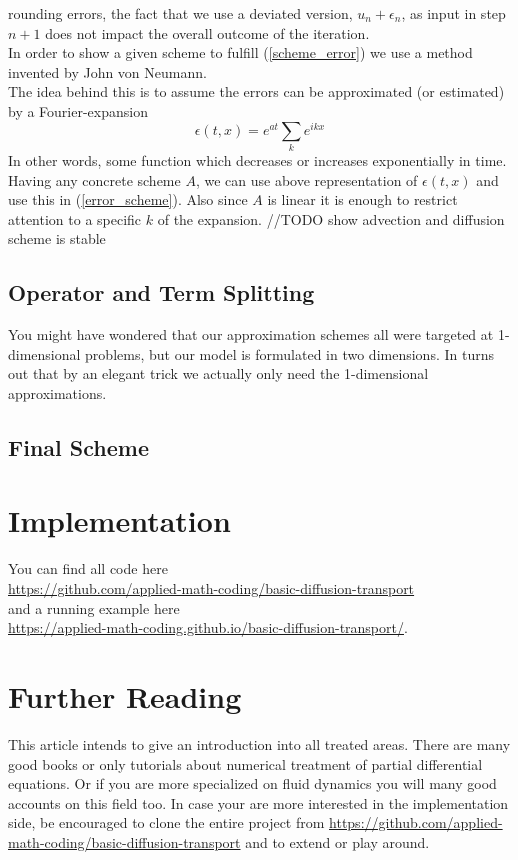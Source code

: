 \documentclass[]{article}
\begin{document}
rounding errors, the fact that we use a deviated version, $u_{n}+\epsilon_{n}$, as input in
step $n+1$ does not impact the overall outcome of the iteration.\\
In order to show a given scheme to fulfill (\ref{scheme_error}) we use a method invented by John von Neumann.\\
The idea behind this is to assume the errors can be approximated (or estimated) by a Fourier-expansion
\begin{equation} \label{error_fourier_exp}
\epsilon(t,x)=e^{at}\sum_{k}e^{ikx}
\end{equation}
In other words, some function which decreases or increases exponentially in time. Having any concrete scheme $A$, we can use above representation of $\epsilon(t,x)$ and use this in (\ref{error_scheme}). Also since $A$ is linear it is enough to restrict attention to a specific $k$ of the expansion.
//TODO show advection and diffusion scheme is stable
 

\subsection{Operator and Term Splitting}
You might have wondered that our approximation schemes all were targeted at 1-dimensional problems, but our model is formulated in two dimensions. In turns out that by an elegant trick
we actually only need the 1-dimensional approximations.

\subsection{Final Scheme}

\section{Implementation}
You can find all code here \\ \url{https://github.com/applied-math-coding/basic-diffusion-transport} \\ and
a running example here \\
 \url{https://applied-math-coding.github.io/basic-diffusion-transport/}.

\section{Further Reading}
This article intends to give an introduction into all treated areas.
There are many good books or only tutorials about numerical treatment of partial
differential equations. Or if you are more specialized on fluid dynamics you will
many good accounts on this field too. In case your are more interested in the 
implementation side, be encouraged to clone the entire project from
\url{https://github.com/applied-math-coding/basic-diffusion-transport} and to extend or play around.
\end{document}

